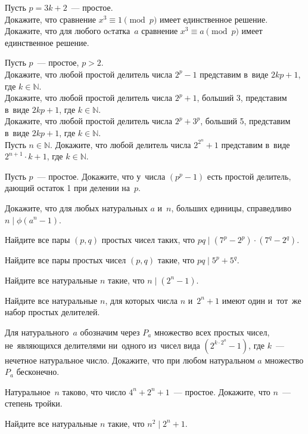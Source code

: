 \begin{problems}

\item
Пусть $p = 3 k + 2$~--- простое.
\\
\subproblem
Докажите, что сравнение $x^3 \equiv 1 \pmod{p}$ имеет единственное решение.
\\
\subproblem
Докажите, что для любого оcтатка~$a$ сравнение $x^3 \equiv a \pmod{p}$ имеет
единственное решение.

\item
Пусть $p$~--- простое, $p > 2$.
\\
\subproblem
Докажите, что любой простой делитель числа $2^p - 1$ представим
в~виде $2 k p + 1$, где $k \in \mathbb{N}$.
\\
\subproblem
Докажите, что любой простой делитель числа $2^p + 1$, больший 3, представим
в~виде $2 k p + 1$, где $k \in \mathbb{N}$.
\\
\subproblem
Докажите, что любой простой делитель числа $2^p + 3^p$, больший 5, представим
в~виде $2 k p + 1$, где $k \in \mathbb{N}$.
\\
\subproblem
Пусть $n \in \mathbb{N}$.
Докажите, что любой делитель числа $2^{2^n} + 1$ представим
в~виде $2^{n+1} \cdot k + 1$, где $k \in \mathbb{N}$.

\item
Пусть $p$~--- простое.
Докажите, что у~числа $(p^p - 1)$ есть простой делитель, дающий остаток 1 при
делении на~$p$.

\item
Докажите, что для любых натуральных $a$ и~$n$, больших единицы, справедливо
$n \mid \phi(a^n - 1)$.

\item
Найдите все пары $(p, q)$ простых чисел таких, что
$p q \mid (7^{p} - 2^{p}) \cdot (7^{q} - 2^{q})$.

\item
Найдите все пары простых чисел $(p, q)$ такие, что $p q \mid 5^{p} + 5^{q}$.

\item
Найдите все натуральные $n$ такие, что $n \mid (2^n - 1)$.

\item
Найдите все натуральные $n$, для которых числа $n$ и~$2^n + 1$ имеют один
и~тот~же набор простых делителей. 	

\item
Для натурального~$a$ обозначим через $P_a$ множество всех простых чисел,
не~являющихся делителями ни~одного из~чисел вида $(2^{k \cdot 2^a} - 1)$, где
$k$~--- нечетное натуральное число.
Докажите, что при любом натуральном $a$ множество $P_a$ бесконечно.

\item
Натуральное~$n$ таково, что число $4^n + 2^n + 1$~--- простое.
Докажите, что $n$~--- степень тройки. 

\item
Найдите все натуральные $n$ такие, что $n^2 \mid 2^n + 1$.

\end{problems}

